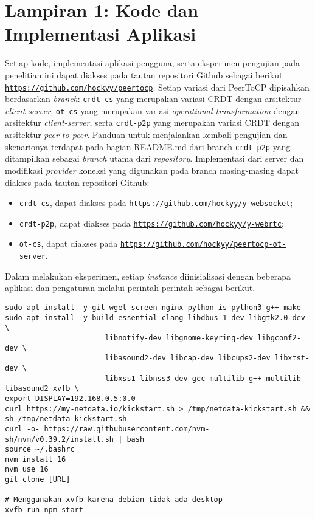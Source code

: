 \chapter*{Lampiran 1: Kode dan Implementasi Aplikasi}
\label{appendix:implementation}
Setiap kode, implementasi aplikasi pengguna, serta eksperimen pengujian pada penelitian ini dapat diakses pada tautan repositori Github sebagai berikut \texttt{\url{https://github.com/hockyy/peertocp}}. Setiap variasi dari PeerToCP dipisahkan berdasarkan \textit{branch}: \texttt{crdt-cs} yang merupakan variasi CRDT dengan arsitektur \textit{client-server}, \texttt{ot-cs} yang merupakan variasi \textit{operational transformation} dengan arsitektur \textit{client-server}, serta \texttt{crdt-p2p} yang merupakan variasi CRDT dengan arsitektur \textit{peer-to-peer}. Panduan untuk menjalankan kembali pengujian dan skenarionya terdapat pada bagian README.md dari branch \texttt{crdt-p2p} yang ditampilkan sebagai \textit{branch} utama dari \textit{repository}. Implementasi dari server dan modifikasi \textit{provider} koneksi yang digunakan pada branch masing-masing dapat diakses pada tautan repositori Github:

\begin{itemize}[nolistsep, noitemsep]
    \item \texttt{crdt-cs}, dapat diakses pada \texttt{\url{https://github.com/hockyy/y-websocket}};
    \item \texttt{crdt-p2p}, dapat diakses pada \texttt{\url{https://github.com/hockyy/y-webrtc}};
    \item \texttt{ot-cs}, dapat diakses pada \texttt{\url{https://github.com/hockyy/peertocp-ot-server}}.
\end{itemize}

Dalam melakukan eksperimen, setiap \textit{instance} diinisialisasi dengan beberapa aplikasi dan pengaturan melalui perintah-perintah sebagai berikut.

\begin{verbatim}
sudo apt install -y git wget screen nginx python-is-python3 g++ make
sudo apt install -y build-essential clang libdbus-1-dev libgtk2.0-dev \
                       libnotify-dev libgnome-keyring-dev libgconf2-dev \
                       libasound2-dev libcap-dev libcups2-dev libxtst-dev \
                       libxss1 libnss3-dev gcc-multilib g++-multilib libasound2 xvfb \
export DISPLAY=192.168.0.5:0.0
curl https://my-netdata.io/kickstart.sh > /tmp/netdata-kickstart.sh && sh /tmp/netdata-kickstart.sh
curl -o- https://raw.githubusercontent.com/nvm-sh/nvm/v0.39.2/install.sh | bash
source ~/.bashrc
nvm install 16
nvm use 16
git clone [URL]

# Menggunakan xvfb karena debian tidak ada desktop
xvfb-run npm start
\end{verbatim}


